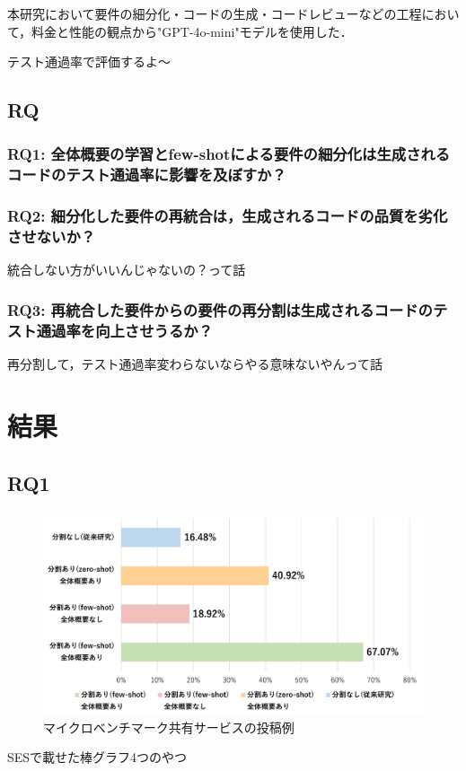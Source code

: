 \documentclass[submit,techrep,noauthor]{ipsj}
\begin{document}
本研究において要件の細分化・コードの生成・コードレビューなどの工程において，料金と性能の観点から"GPT-4o-mini"モデルを使用した．

テスト通過率で評価するよ〜

\subsection{RQ}
\subsubsection{RQ1: 全体概要の学習とfew-shotによる要件の細分化は生成されるコードのテスト通過率に影響を及ぼすか？}
\subsubsection{RQ2: 細分化した要件の再統合は，生成されるコードの品質を劣化させないか？}
統合しない方がいいんじゃないの？って話
\subsubsection{RQ3: 再統合した要件からの要件の再分割は生成されるコードのテスト通過率を向上させうるか？}
再分割して，テスト通過率変わらないならやる意味ないやんって話

\section{結果}

\subsection{RQ1}
\begin{figure}[t]
    \centering
    \includegraphics[width=1.0\linewidth]{./Toyoshima_fig/SIGSE_fig1.pdf}
    \caption{マイクロベンチマーク共有サービスの投稿例\protect\footnotemark}
    \label{fig:jsPerf}
\end{figure}
SESで載せた棒グラフ4つのやつ
\end{document}

